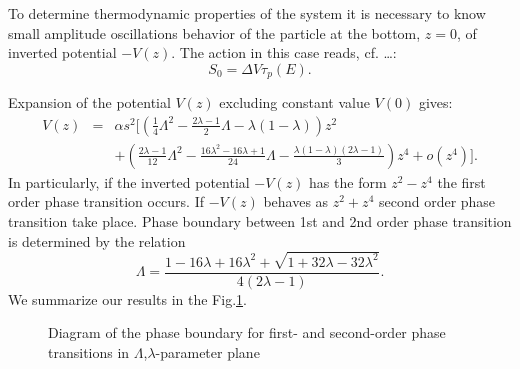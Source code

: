 \documentclass[aps, pre, preprint, groupedaddress, superscriptaddress, showkeys, showpacs] {revtex4-1}
\begin{document}
To determine thermodynamic properties of the system it is necessary to know small amplitude oscillations behavior of the particle at the bottom, $z=0$, of inverted potential $-V(z)$.
The action in this case reads, {\red cf. \dots}:
%
\begin{equation}
S_0 = \Delta V \tau_p (E).
\label{eq:thermal_action}
\end{equation}
%

Expansion of the potential $V(z)$ excluding constant value $V(0)$ gives:
%
\begin{equation}
\begin{array}{lcl}
V(z) & = & \alpha s^2 \Big[ \left( \frac{1}{4} \Lambda^2  - \frac{2\lambda - 1}{2} \Lambda - \lambda (1 - \lambda) \right) z^2 \\
&& + \left( \frac{2\lambda - 1}{12} \Lambda^2 - \frac{16\lambda^2 - 16\lambda + 1}{24} \Lambda - \frac{\lambda (1 - \lambda) (2\lambda - 1)}{3} \right) z^4 + o(z^4) \Big].
\end{array}
\label{eq:potential_teylor}
\end{equation}
%
In particularly, if the inverted potential $-V(z)$ has the form $z^2 - z^4$ the first order phase transition occurs.
If $-V(z)$ behaves as $z^2 + z^4$ second order phase transition take place.
Phase boundary between 1st and 2nd order phase transition is determined by the relation
%
\begin{equation}
\Lambda = \frac{1 - 16\lambda + 16\lambda^2 + \sqrt{1 + 32\lambda - 32\lambda^2}}{4(2\lambda - 1)}.
\label{eq:order_border}
\end{equation}
%
We summarize our results in the Fig.\ref{pic:phase_boundary_combined}. 
%
\begin{figure}[ht]
\caption{Diagram of the phase boundary for  first- and second-order  phase transitions in $\Lambda$,$\lambda$-parameter plane \label{pic:phase_boundary_combined}}
\end{figure}
%
\end{document}
